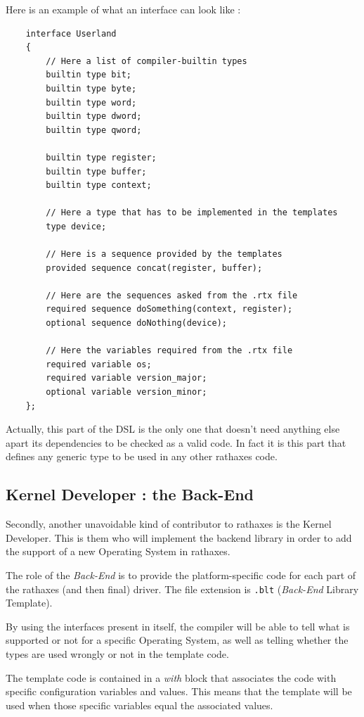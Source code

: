 \documentclass{rtxreport}
\begin{document}
Here is an example of what an interface can look like :
\begin{lstlisting}
    interface Userland
    {
        // Here a list of compiler-builtin types
        builtin type bit;
        builtin type byte;
        builtin type word;
        builtin type dword;
        builtin type qword;

        builtin type register;
        builtin type buffer;
        builtin type context;

        // Here a type that has to be implemented in the templates
        type device;

        // Here is a sequence provided by the templates
        provided sequence concat(register, buffer);

        // Here are the sequences asked from the .rtx file
        required sequence doSomething(context, register);
        optional sequence doNothing(device);

        // Here the variables required from the .rtx file
        required variable os;
        required variable version_major;
        optional variable version_minor;
    };
\end{lstlisting}

Actually, this part of the DSL is the only one that doesn't need anything else
apart its dependencies to be checked as a valid code. In fact it is this part
that defines any generic type to be used in any other rathaxes code.

\subsection{Kernel Developer : the Back-End}
\lstset{language=blt}

Secondly, another unavoidable kind of contributor to rathaxes is the Kernel
Developer. This is them who will implement the backend library in order to add
the support of a new Operating System in rathaxes.

The role of the \emph{Back-End} is to provide the platform-specific code for
each part of the rathaxes (and then final) driver. The file extension is
\texttt{.blt} (\emph{Back-End} Library Template).

By using the interfaces present in itself, the compiler will be able to tell
what is supported or not for a specific Operating System, as well as telling
whether the types are used wrongly or not in the template code.

The template code is contained in a \emph{with} block that associates the code
with specific configuration variables and values. This means that the template
will be used when those specific variables equal the associated values.
\end{document}
